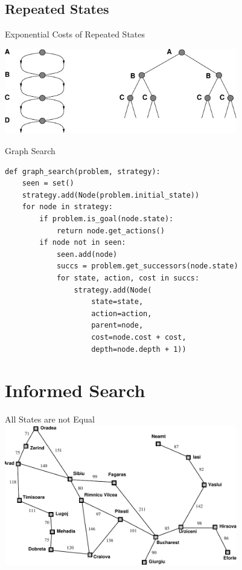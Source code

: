 \documentclass[14pt]{beamer}
\begin{document}
\subsection*{Repeated States}
\begin{frame}{Exponential Costs of Repeated States}
\begin{center}
\includegraphics[width=4in]{ribbon-space.pdf}
\end{center}
\end{frame}
\begin{frame}[fragile]{Graph Search}
\scriptsize
\begin{lstlisting}
def graph_search(problem, strategy):
    seen = set()
    strategy.add(Node(problem.initial_state))
    for node in strategy:
        if problem.is_goal(node.state):
            return node.get_actions()
        if node not in seen:
            seen.add(node)
            succs = problem.get_successors(node.state)
            for state, action, cost in succs:
                strategy.add(Node(
                    state=state,
                    action=action,
                    parent=node,
                    cost=node.cost + cost,
                    depth=node.depth + 1))
\end{lstlisting}
\end{frame}

\section{Informed Search}
\begin{frame}{All States are not Equal}
\includegraphics[width=4in]{romania-distances.pdf}
\end{frame}
\end{document}
